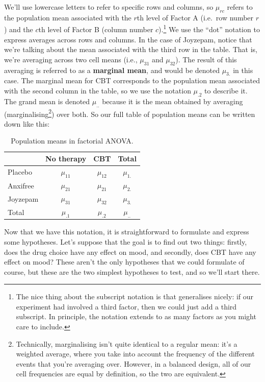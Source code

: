 \documentclass[
  11pt,
  a4paper,
  twoside,symmetric,openright]{book}
\theoremstyle{break}
\theoremstyle{break}
\begin{document}
We'll use lowercase letters to refer to specific rows and columns, so \(\mu_{rc}\) refers to the population mean associated with the \(r\)th level of Factor A (i.e.~row number \(r\)) and the \(c\)th level of Factor B (column number \(c\)).\footnote{The nice thing about the subscript notation is that generalises nicely: if our experiment had involved a third factor, then we could just add a third subscript. In principle, the notation extends to as many factors as you might care to include.} We use the ``dot'' notation to express averages across rows and columns. In the case of Joyzepam, notice that we're talking about the mean associated with the third row in the table. That is, we're averaging across two cell means (i.e., \(\mu_{31}\) and \(\mu_{32}\)). The result of this averaging is referred to as a \textbf{marginal mean}, and would be denoted \(\mu_{3.}\) in this case. The marginal mean for CBT corresponds to the population mean associated with the second column in the table, so we use the notation \(\mu_{.2}\) to describe it. The grand mean is denoted \(\mu_{..}\) because it is the mean obtained by averaging (marginalising\footnote{Technically, marginalising isn't quite identical to a regular mean: it's a weighted average, where you take into account the frequency of the different events that you're averaging over. However, in a balanced design, all of our cell frequencies are equal by definition, so the two are equivalent.}) over both. So our full table of population means can be written down like this:

\begin{table}[!h]

\caption{\label{tab:unnamed-chunk-79}Population means in factorial ANOVA.}
\centering
\begin{tabular}[t]{lccc}
\toprule
 & No therapy & CBT & Total\\
\midrule
Placebo & $\mu_{11}$ & $\mu_{12}$ & $\mu_{1.}$\\
Anxifree & $\mu_{21}$ & $\mu_{21}$ & $\mu_{2.}$\\
Joyzepam & $\mu_{31}$ & $\mu_{32}$ & $\mu_{3.}$\\
Total & $\mu_{.1}$ & $\mu_{.2}$ & $\mu_{..}$\\
\bottomrule
\end{tabular}
\end{table}

Now that we have this notation, it is straightforward to formulate and express some hypotheses. Let's suppose that the goal is to find out two things: firstly, does the drug choice have any effect on mood, and secondly, does CBT have any effect on mood? These aren't the only hypotheses that we could formulate of course, but these are the two simplest hypotheses to test, and so we'll start there.
\end{document}
